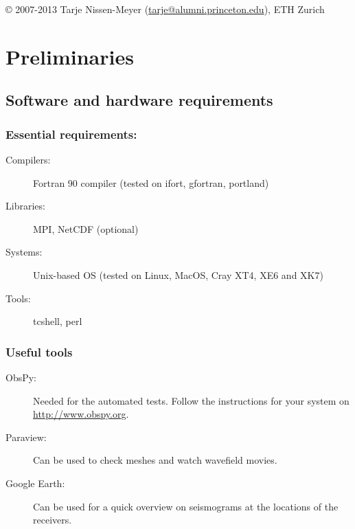 \documentclass[11pt,letter,fleqn,english,notitlepage]{article}
\begin{document}
\noindent \copyright  \hspace*{0.1cm} 
2007-2013 Tarje Nissen-Meyer (\url{tarje@alumni.princeton.edu}), ETH Zurich

\newpage
\tableofcontents
\newpage

\section{Preliminaries}

\subsection{Software and hardware requirements}

\subsubsection{Essential requirements:} 
\begin{description}
 \item[Compilers:] Fortran 90 compiler (tested on ifort, gfortran, portland)
 \item[Libraries:] MPI, NetCDF (optional)
 \item[Systems:] Unix-based OS (tested on Linux, MacOS, Cray XT4, XE6 and XK7)
 \item[Tools:] tcshell, perl
\end{description}
\subsubsection{Useful tools}
\begin{description}
 \item[ObsPy:] Needed for the automated tests. Follow the instructions for your system on \url{http://www.obspy.org}.
 \item[Paraview:] Can be used to check meshes and watch wavefield movies.
 \item[Google Earth:] Can be used for a quick overview on seismograms at the locations of the receivers.
\end{description}



 
\end{document}
